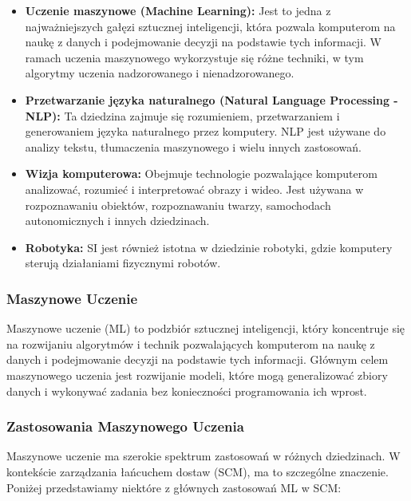 \begin{itemize}
    \item \textbf{Uczenie maszynowe (Machine Learning):} Jest to jedna z najważniejszych gałęzi sztucznej inteligencji, która pozwala komputerom na naukę z danych i podejmowanie decyzji na podstawie tych informacji. W ramach uczenia maszynowego wykorzystuje się różne techniki, w tym algorytmy uczenia nadzorowanego i nienadzorowanego.
    
    \item \textbf{Przetwarzanie języka naturalnego (Natural Language Processing - NLP):} Ta dziedzina zajmuje się rozumieniem, przetwarzaniem i generowaniem języka naturalnego przez komputery. NLP jest używane do analizy tekstu, tłumaczenia maszynowego i wielu innych zastosowań.
    
    \item \textbf{Wizja komputerowa:} Obejmuje technologie pozwalające komputerom analizować, rozumieć i interpretować obrazy i wideo. Jest używana w rozpoznawaniu obiektów, rozpoznawaniu twarzy, samochodach autonomicznych i innych dziedzinach.
    
    \item \textbf{Robotyka:} SI jest również istotna w dziedzinie robotyki, gdzie komputery sterują działaniami fizycznymi robotów.
\end{itemize}

\subsubsection{Maszynowe Uczenie}

Maszynowe uczenie (ML) to podzbiór sztucznej inteligencji, który koncentruje się na rozwijaniu algorytmów i technik pozwalających komputerom na naukę z danych i podejmowanie decyzji na podstawie tych informacji. Głównym celem maszynowego uczenia jest rozwijanie modeli, które mogą generalizować zbiory danych i wykonywać zadania bez konieczności programowania ich wprost.

\subsubsection{Zastosowania Maszynowego Uczenia}

Maszynowe uczenie ma szerokie spektrum zastosowań w różnych dziedzinach. W kontekście zarządzania łańcuchem dostaw (SCM), ma to szczególne znaczenie. Poniżej przedstawiamy niektóre z głównych zastosowań ML w SCM:

